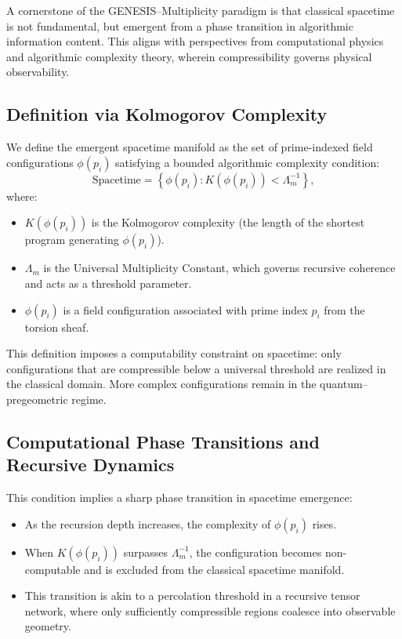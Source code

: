 \documentclass{article}
\theoremstyle{plain}
\begin{document}
A cornerstone of the GENESIS–Multiplicity paradigm is that classical spacetime is not fundamental, but emergent from a phase transition in algorithmic information content. This aligns with perspectives from computational physics and algorithmic complexity theory, wherein compressibility governs physical observability.

\subsection{Definition via Kolmogorov Complexity}

We define the emergent spacetime manifold as the set of prime-indexed field configurations $\phi(p_i)$ satisfying a bounded algorithmic complexity condition:
\[
\text{Spacetime} = \left\{ \phi(p_i) : K(\phi(p_i)) < \Lambda_m^{-1} \right\},
\]
where:
\begin{itemize}
    \item $K(\phi(p_i))$ is the Kolmogorov complexity (the length of the shortest program generating $\phi(p_i)$).
    \item $\Lambda_m$ is the Universal Multiplicity Constant, which governs recursive coherence and acts as a threshold parameter.
    \item $\phi(p_i)$ is a field configuration associated with prime index $p_i$ from the torsion sheaf.
\end{itemize}

This definition imposes a computability constraint on spacetime: only configurations that are compressible below a universal threshold are realized in the classical domain. More complex configurations remain in the quantum–pregeometric regime.

\subsection{Computational Phase Transitions and Recursive Dynamics}

This condition implies a sharp phase transition in spacetime emergence:
\begin{itemize}
    \item As the recursion depth increases, the complexity of $\phi(p_i)$ rises.
    \item When $K(\phi(p_i))$ surpasses $\Lambda_m^{-1}$, the configuration becomes non-computable and is excluded from the classical spacetime manifold.
    \item This transition is akin to a percolation threshold in a recursive tensor network, where only sufficiently compressible regions coalesce into observable geometry.
\end{itemize}
\end{document}
